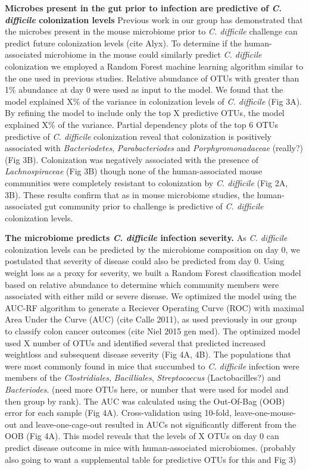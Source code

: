 \documentclass[11pt,]{article}
\begin{document}
\textbf{Microbes present in the gut prior to infection are predictive of
\emph{C. difficile} colonization levels} Previous work in our group has
demonstrated that the microbes present in the mouse microbiome prior to
\emph{C. difficile} challenge can predict future colonization levels
(cite Alyx). To determine if the human-associated microbiome in the
mouse could similarly predict \emph{C. difficile} colonization we
employed a Random Forest machine learning algorithm similar to the one
used in previous studies. Relative abundance of OTUs with greater than
1\% abundance at day 0 were used as input to the model. We found that
the model explained X\% of the variance in colonization levels of
\emph{C. difficile} (Fig 3A). By refining the model to include only the
top X predictive OTUs, the model explained X\% of the variance. Partial
dependency plots of the top 6 OTUs predictive of \emph{C. difficile}
colonization reveal that colonization is positively associated with
\emph{Bacteriodetes}, \emph{Parabacteriodes} and
\emph{Porphyromonadaceae} (really?) (Fig 3B). Colonization was
negatively associated with the presence of \emph{Lachnospiraceae} (Fig
3B) though none of the human-associated mouse communities were
completely resistant to colonization by \emph{C. difficile} (Fig 2A,
3B). These results confirm that as in mouse microbiome studies, the
human-associated gut community prior to challenge is predictive of
\emph{C. difficile} colonization levels.

\textbf{The microbiome predicts \emph{C. difficile} infection severity.}
As \emph{C. difficile} colonization levels can be predicted by the
microbiome composition on day 0, we postulated that severity of disease
could also be predicted from day 0. Using weight loss as a proxy for
severity, we built a Random Forest classification model based on
relative abundance to determine which community members were associated
with either mild or severe disease. We optimized the model using the
AUC-RF algorithm to generate a Reciever Operating Curve (ROC) with
maximal Area Under the Curve (AUC) (cite Calle 2011), as used previously
in our group to classify colon cancer outcomes (cite Niel 2015 gen med).
The optimized model used X number of OTUs and identified several that
predicted increased weightloss and subsequent disease severity (Fig 4A,
4B). The populations that were most commonly found in mice that
succumbed to \emph{C. difficile} infection were members of the
\emph{Clostridiales}, \emph{Bacilliales}, \emph{Streptococcus}
(Lactobacilles?) and \emph{Bacteriodes}. (need more OTUs here, or number
that were used for model and then group by rank). The AUC was calculated
using the Out-Of-Bag (OOB) error for each sample (Fig 4A).
Cross-validation using 10-fold, leave-one-mouse-out and
leave-one-cage-out resulted in AUCs not significantly different from the
OOB (Fig 4A). This model reveals that the levels of X OTUs on day 0 can
predict disease outcome in mice with human-associated microbiomes.
(probably also going to want a supplemental table for predictive OTUs
for this and Fig 3)
\end{document}
